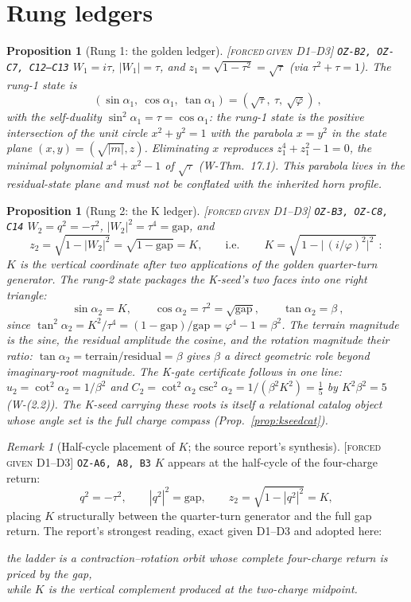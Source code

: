 \documentclass[11pt]{article}
\newcommand{\tagFD}{\textcolor{cF}{\textsc{[forced}}\,\textcolor{cD}{\textsc{given D1--D3]}}}
\newcommand{\hx}[1]{\textcolor{cC}{\footnotesize\texttt{#1}}}
\newcommand{\gp}{\varphi}
\newcommand{\gapc}{\mathrm{gap}}
\theoremstyle{plain}
\newtheorem{proposition}[theorem]{Proposition}
\theoremstyle{definition}
\theoremstyle{remark}
\newtheorem{remark}[theorem]{Remark}
\begin{document}
\section{Rung ledgers}\label{sec:ledgers}

\begin{proposition}[Rung 1: the golden ledger]\label{prop:rung1}\tagFD{} \hx{OZ-B2, OZ-C7, C12--C13}
$W_1=i\tau$, $|W_1|=\tau$, and $z_1=\sqrt{1-\tau^2}=\sqrt\tau$ (via
$\tau^2+\tau=1$). The rung-1 state is
\[
\boxed{\ (\sin\alpha_1,\ \cos\alpha_1,\ \tan\alpha_1)=(\sqrt\tau,\ \tau,\ \sqrt\gp)\ },
\]
with the self-duality $\sin^2\alpha_1=\tau=\cos\alpha_1$: the rung-1 state is the
positive intersection of the unit circle $x^2+y^2=1$ with the parabola $x=y^2$ in
the state plane $(x,y)=(\sqrt{|m|},z)$. Eliminating $x$ reproduces
$z_1^4+z_1^2-1=0$, the minimal polynomial $x^4+x^2-1$ of $\sqrt\tau$
(W-Thm.\ 17.1). This parabola lives in the residual-state plane and must not be
conflated with the inherited horn profile.
\end{proposition}

\begin{proposition}[Rung 2: the K ledger]\label{prop:rung2}\tagFD{} \hx{OZ-B3, OZ-C8, C14}
$W_2=q^2=-\tau^2$, $|W_2|^2=\tau^4=\gapc$, and
\[
z_2=\sqrt{1-|W_2|^2}=\sqrt{1-\gapc}=K,
\qquad\text{i.e.}\qquad
\boxed{\ K=\sqrt{\,1-\bigl|\,(i/\gp)^2\bigr|^2\,}\ }:
\]
$K$ is the vertical coordinate after two applications of the golden quarter-turn
generator. The rung-2 state packages the K-seed's two faces into one right
triangle:
\[
\boxed{\ \sin\alpha_2=K,\qquad \cos\alpha_2=\tau^2=\sqrt{\gapc},\qquad
\tan\alpha_2=\beta\ },
\]
since $\tan^2\alpha_2=K^2/\tau^4=(1-\gapc)/\gapc=\gp^4-1=\beta^2$. The terrain
magnitude is the sine, the residual amplitude the cosine, and the rotation
magnitude their ratio: $\tan\alpha_2=\text{terrain}/\text{residual}=\beta$ gives
$\beta$ a direct geometric role beyond imaginary-root magnitude. The K-gate
certificate follows in one line:
$u_2=\cot^2\alpha_2=1/\beta^2$ and
$C_2=\cot^2\alpha_2\csc^2\alpha_2=1/(\beta^2K^2)=\tfrac15$ by $K^2\beta^2=5$
(W-(2.2)). The K-seed carrying these roots is itself a relational catalog
object whose angle set is the full charge compass
(Prop.~\ref{prop:kseedcat}).
\end{proposition}

\begin{remark}[Half-cycle placement of $K$; the source report's synthesis]\label{rem:halfcycle}\tagFD{} \hx{OZ-A6, A8, B3}
$K$ appears at the half-cycle of the four-charge return:
\[
q^2=-\tau^2,\qquad |q^2|^2=\gapc,\qquad z_2=\sqrt{1-|q^2|^2}=K ,
\]
placing $K$ structurally between the quarter-turn generator and the full gap
return. The report's strongest reading, exact given D1--D3 and adopted here:
\begin{center}
\emph{the ladder is a contraction--rotation orbit whose complete four-charge
return is priced by the gap,\\ while $K$ is the vertical complement produced
at the two-charge midpoint.}
\end{center}
\end{remark}
\end{document}
